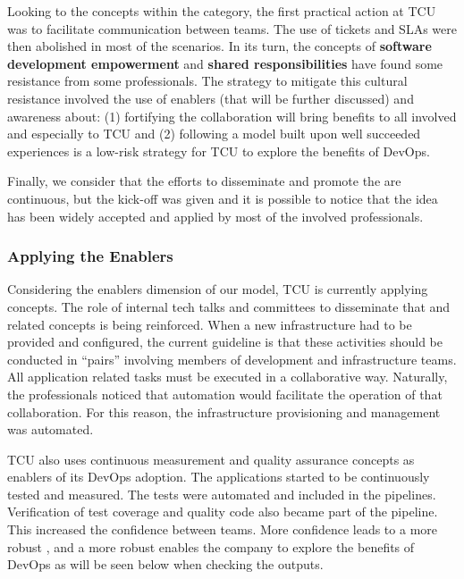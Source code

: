 Looking to the concepts within the \cc category, the first practical action at
TCU was to facilitate communication between teams. The use of tickets and
SLAs were then abolished in most of the scenarios. In its turn, the concepts of
\textbf{software development empowerment} and \textbf{shared responsibilities}
have found some resistance from some professionals. The strategy to mitigate this
cultural resistance involved the use of enablers (that will be further discussed)
and awareness about: (1) fortifying the collaboration will bring benefits
to all involved and especially to TCU and (2) following a model built upon
well succeeded experiences is a low-risk strategy for TCU to explore the
benefits of DevOps.

Finally, we consider that the efforts to disseminate and promote the \cc are
continuous, but the kick-off was given and it is possible to notice that the
idea has been widely accepted and applied by most of the involved professionals.

\subsubsection{Applying the Enablers}

Considering the enablers dimension of our model, TCU is currently
applying  concepts.
The role of internal tech talks and committees to disseminate that \cc
and related concepts is being reinforced. When a new infrastructure had
to be provided and configured, the current guideline is that these
activities should be conducted in ``pairs'' involving members of
development and infrastructure teams. All application related tasks must be executed in a collaborative
way. Naturally, the professionals noticed that automation would facilitate the
operation of that collaboration. For this reason, the infrastructure
provisioning and management was automated.

TCU also uses continuous measurement and quality assurance concepts as
enablers of its DevOps adoption. The applications started to be continuously
tested and measured. The tests were automated and included in the pipelines.
Verification of test coverage and quality code also became part of the pipeline.
This increased the confidence between teams. More confidence leads to a more
robust \cc, and a more robust \cc enables the company to explore the benefits
of DevOps as will be seen below when checking the outputs.

